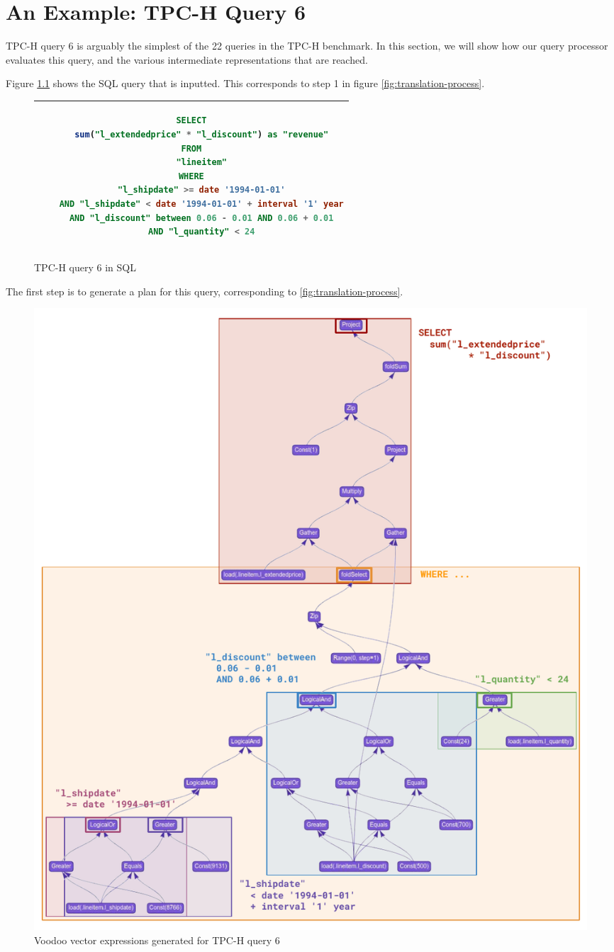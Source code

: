 \appendix

\chapter{An Example: TPC-H Query 6}
\label{appendix:full-query}

TPC-H query 6 is arguably the simplest of the 22 queries in the TPC-H benchmark. In this section, we will show how our query processor evaluates this query, and the various intermediate representations that are reached.

Figure \ref{fig:q6-sql} shows the SQL query that is inputted. This corresponds to step 1 in figure \ref{fig:translation-process}.

\begin{figure}[H]
    \centering
    \begin{tabular}{|c|}
    \hline
    \begin{lstlisting}[language=SQL]
SELECT
    sum("l_extendedprice" * "l_discount") as "revenue"
FROM
    "lineitem"
WHERE
    "l_shipdate" >= date '1994-01-01'
    AND "l_shipdate" < date '1994-01-01' + interval '1' year
    AND "l_discount" between 0.06 - 0.01 AND 0.06 + 0.01
    AND "l_quantity" < 24
    \end{lstlisting} \\
    \hline
    \end{tabular}
    \caption{TPC-H query 6 in SQL}
    \label{fig:q6-sql}
\end{figure}

The first step is to generate a plan for this query, corresponding to  \ref{fig:translation-process}.

\begin{figure}
    \centering
    \includegraphics[width=0.95\linewidth]{appendix/q6-voodoo.pdf}
    \caption{Voodoo vector expressions generated for TPC-H query 6}
    \label{fig:q6-voodoo}
\end{figure}

